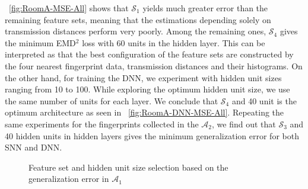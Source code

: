 \documentclass{article}
\begin{document}
	\figurename~\ref{fig:RoomA-MSE-All} shows that $\mathcal{S}_1$ yields much greater error than the remaining feature sets, meaning that the estimations depending solely on transmission distances perform very poorly. Among the remaining ones, $\mathcal{S}_4$ gives the minimum EMD$^2$ loss with 60 units in the hidden layer. This can be interpreted as that the best configuration of the feature sets are constructed by the four nearest fingerprint data, transmission distances and their histograms. On the other hand, for training the DNN, we experiment with hidden unit sizes ranging from 10 to 100. While exploring the optimum hidden unit size, we use the same number of units for each layer. We conclude that $\mathcal{S}_4$ and 40 unit is the optimum architecture as seen in \figurename~\ref{fig:RoomA-DNN-MSE-All}. Repeating the same experiments for the fingerprints collected in the $\mathcal{A}_2$, we find out that $\mathcal{S}_3$ and 40 hidden units in hidden layers gives the minimum generalization error for both SNN and DNN. 
	\begin{figure}[h]
		\centering
		\caption{Feature set and hidden unit size selection based on the generalization error in $\mathcal{A}_1$}
	\end{figure}
	
\end{document}
